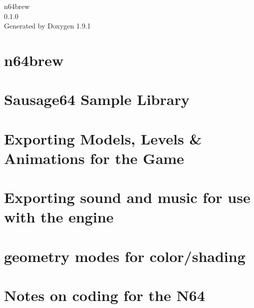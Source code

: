 \let\mypdfximage\pdfximage\def\pdfximage{\immediate\mypdfximage}\documentclass[twoside]{book}
\newcommand{\+}{\discretionary{\mbox{\scriptsize$\hookleftarrow$}}{}{}}
\newcommand{\clearemptydoublepage}{%
  \newpage{\pagestyle{empty}\cleardoublepage}%
}
\begin{document}
\raggedbottom

\hypersetup{pageanchor=false,
             bookmarksnumbered=true,
             pdfencoding=unicode
            }
\begin{titlepage}
\vspace*{7cm}
\begin{center}%
{\Large n64brew \\[1ex]\large 0.\+1.\+0 }\\
\vspace*{1cm}
{\large Generated by Doxygen 1.9.1}\\
\end{center}
\end{titlepage}
\clearemptydoublepage
{}
\tableofcontents
\clearemptydoublepage
{}
\hypersetup{pageanchor=true}

\chapter{n64brew}
\label{index}\hypertarget{index}{}
\chapter{Sausage64 Sample Library}
\label{md_src_sausage64_README}

\chapter{Exporting Models, Levels \& Animations for the Game}
\label{md_docs_ART}

\chapter{Exporting sound and music for use with the engine}
\label{md_docs_AUDIO}

\chapter{geometry modes for color/shading}
\label{md_docs_GRAPHICS}

\chapter{Notes on coding for the N64}
\label{md_docs_N64}

\end{document}
